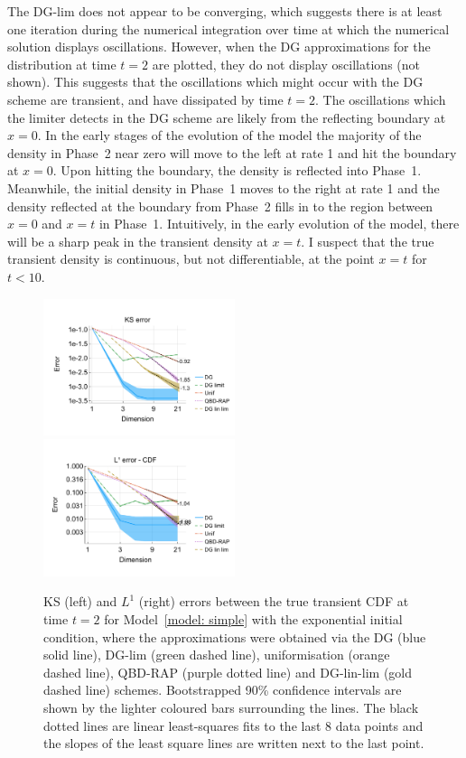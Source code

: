 The DG-lim does not appear to be converging, which suggests there is at least one iteration during the numerical integration over time at which the numerical solution displays oscillations. However, when the DG approximations for the distribution at time \(t=2\) are plotted, they do not display oscillations (not shown). This suggests that the oscillations which might occur with the DG scheme are transient, and have dissipated by time \(t=2\). The oscillations which the limiter detects in the DG scheme are likely from the reflecting boundary at \(x=0\). In the early stages of the evolution of the model the majority of the density in Phase~2 near zero will move to the left at rate 1 and hit the boundary at \(x=0\). Upon hitting the boundary, the density is reflected into Phase~1. Meanwhile, the initial density in Phase~1 moves to the right at rate 1 and the density reflected at the boundary from Phase~2 fills in to the region between \(x=0\) and \(x=t\) in Phase~1. Intuitively, in the early evolution of the model, there will be a sharp peak in the transient density at \(x=t\). I suspect that the true transient density is continuous, but not differentiable, at the point \(x=t\) for \(t<10\).  %
\begin{figure}[h]
	\centering
	\includegraphics[width=0.5\textwidth,trim={0.75cm 0.8cm 0.25cm 1.25cm},clip]{chapter6/figs/hitting_times_model/reflecting_model/transient_distribution/exp/ks_error_formatted.pdf}%
	\includegraphics[width=0.5\textwidth,trim={0.75cm 0.8cm 0.25cm 1.25cm},clip]{chapter6/figs/hitting_times_model/reflecting_model/transient_distribution/exp/l1_cdf_error_formatted.pdf}
	\caption{KS (left) and \(L^1\) (right) errors between the true transient CDF at time \(t=2\) for Model~\ref{model: simple} with the exponential initial condition, where the approximations were obtained via the DG (blue solid line), DG-lim (green dashed line), uniformisation (orange dashed line), QBD-RAP (purple dotted line) and DG-lin-lim (gold dashed line) schemes. Bootstrapped 90\% confidence intervals are shown by the lighter coloured bars surrounding the lines. The black dotted lines are linear least-squares fits to the last 8 data points and the slopes of the least square lines are written next to the last point.} 
	\label{fig: reflecting transient exp} 
\end{figure}

